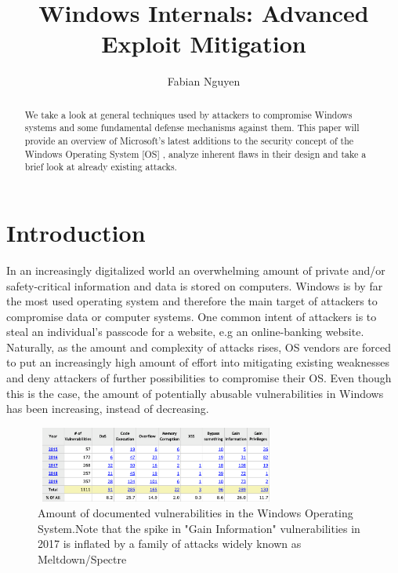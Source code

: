 \documentclass[10pt,twocolumn,a4paper]{article}
\author{Fabian Nguyen}
\begin{document}
\title{Windows Internals: Advanced Exploit Mitigation}

\newcommand{\todo}[1]{{\texttt{[#1]}}}
\newcommand{\code}[1]{{\tt \small{#1}}}

\maketitle

\begin{abstract}
We take a look at general techniques used by attackers to compromise Windows systems and some fundamental defense mechanisms against them.
This paper will provide an overview of Microsoft's latest additions to the security concept of the Windows Operating System [OS] , analyze inherent flaws in their design and take a brief look at already existing attacks. 
\end{abstract}

\section{Introduction}\label{sec:introduction}
In an increasingly digitalized world an overwhelming amount of private and/or safety-critical information and data is stored on computers.
Windows is by far the most used operating system and therefore the main target of attackers to compromise data or computer systems.
One common intent of attackers is to steal an individual's passcode for a website, e.g an online-banking website.
Naturally, as the amount and complexity of attacks rises, OS vendors are forced to put an increasingly high amount of effort into mitigating existing weaknesses and deny attackers of further possibilities to compromise their OS.
Even though this is the case, the amount of potentially abusable vulnerabilities in Windows has been increasing, instead of decreasing.

\begin{figure}[htbp]
\includegraphics[width=8cm, height=2.5cm]{fig/stats}
\caption{Amount of documented vulnerabilities in the Windows Operating System.\newline Note that the spike in "Gain Information" vulnerabilities in 2017 is inflated by a family of attacks widely known as Meltdown/Spectre}
\end{figure}
\end{document}

